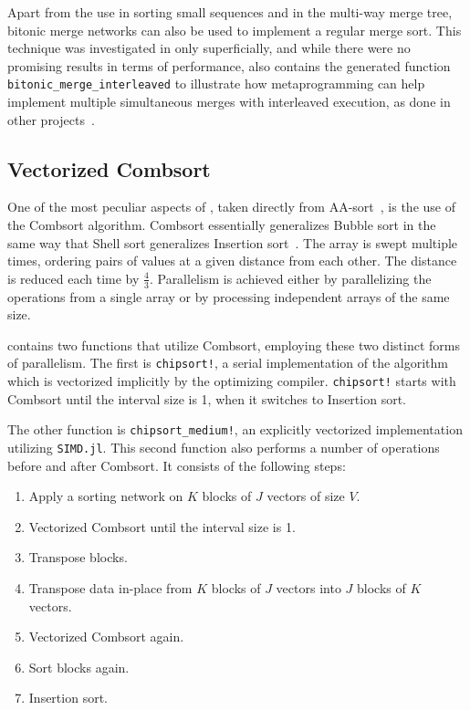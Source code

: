 \documentclass{juliacon}
\begin{document}
Apart from the use in sorting small sequences and in the multi-way merge tree, bitonic merge networks can also be used to implement a regular merge sort. This technique was investigated in \chipsort only superficially, and while there were no promising results in terms of performance, \chipsort also contains the generated function {\tt bitonic\_merge\_interleaved} to illustrate how metaprogramming can help implement multiple simultaneous merges with interleaved execution, as done in other projects~\cite{DBLP:journals/pvldb/ChhuganiNLMHCBKD08}.

\subsection{Vectorized Combsort}
%
One of the most peculiar aspects of \chipsort, taken directly from AA-sort~\cite{DBLP:conf/IEEEpact/InoueMKN07,DBLP:journals/pvldb/InoueT15}, is the use of the Combsort algorithm. Combsort essentially generalizes Bubble sort in the same way that Shell sort generalizes Insertion sort~\cite{INCERPI198737,dobosiewicz1980efficient,Lacey:1991:FES:117187.117218,DBLP:books/lib/Knuth98a,DBLP:books/daglib/0023376}. The array is swept multiple times, ordering pairs of values at a given distance from each other. The distance is reduced each time by $\frac{4}{3}$. Parallelism is achieved either by parallelizing the operations from a single array or by processing independent arrays of the same size.

\chipsort contains two functions that utilize Combsort, employing these two distinct forms of parallelism. The first is {\tt chipsort!}, a serial implementation of the algorithm which is vectorized implicitly by the optimizing compiler. {\tt chipsort!} starts with Combsort until the interval size is 1, when it switches to Insertion sort.

The other function is {\tt chipsort\_medium!}, an explicitly vectorized implementation utilizing {\tt SIMD.jl}. This second function also performs a number of operations before and after Combsort. It consists of the following steps:
\begin{enumerate}
\item Apply a sorting network on $K$ blocks of $J$ vectors of size $V$.
\item Vectorized Combsort until the interval size is 1.
\item Transpose blocks.
\item Transpose data in-place from $K$ blocks of $J$ vectors into $J$ blocks of $K$ vectors.
\item Vectorized Combsort again.
\item Sort blocks again.
\item Insertion sort.
\end{enumerate}
\end{document}
